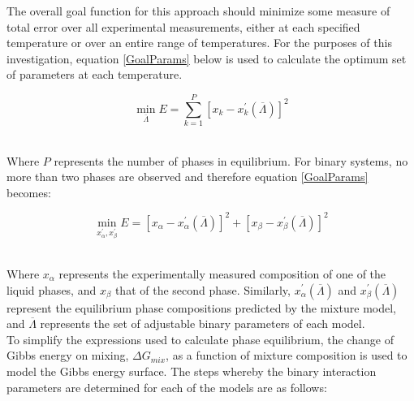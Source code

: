 The overall goal function for this approach should minimize some measure of total error over all experimental measurements, either at each specified temperature or over an entire range of temperatures. For the purposes of this investigation, equation \ref{GoalParams} below is used to calculate the optimum set of parameters at each temperature.\

\begin{equation}
\min_{\overline{\Lambda}} E = \sum_{k=1}^{P} \left[x_{k}-x_{k}^{\prime}\left(\overline{\Lambda}\right)\right]^{2} \label{GoalParams}
\end{equation}\

Where $P$ represents the number of phases in equilibrium. For binary systems, no more than two phases are observed and therefore equation \ref{GoalParams} becomes:\

\begin{equation}
\min_{ x_{\alpha}^{\prime}, x_{\beta}^{\prime}} E = \left[x_{\alpha}-x_{\alpha}^{\prime}\left(\overline{\Lambda}\right)\right]^{2} + \left[x_{\beta}-x_{\beta}^{\prime}\left(\overline{\Lambda}\right) \right]^{2} \label{GoalParamsBinary}
\end{equation}\

Where $x_{\alpha}$ represents the experimentally measured composition of one of the liquid phases, and $x_{\beta}$ that of the second phase. Similarly, $x_{\alpha}^{\prime}\left(\overline{\Lambda}\right)$ and $x_{\beta}^{\prime}\left(\overline{\Lambda}\right)$ represent the equilibrium phase compositions predicted by the mixture model, and $\overline{\Lambda}$ represents the set of adjustable binary parameters of each model.\\

To simplify the expressions used to calculate phase equilibrium, the change of Gibbs energy on mixing, $\Delta G_{mix}$, as a function of mixture composition is used to model the Gibbs energy surface. The steps whereby the binary interaction parameters are determined for each of the models are as follows:\

